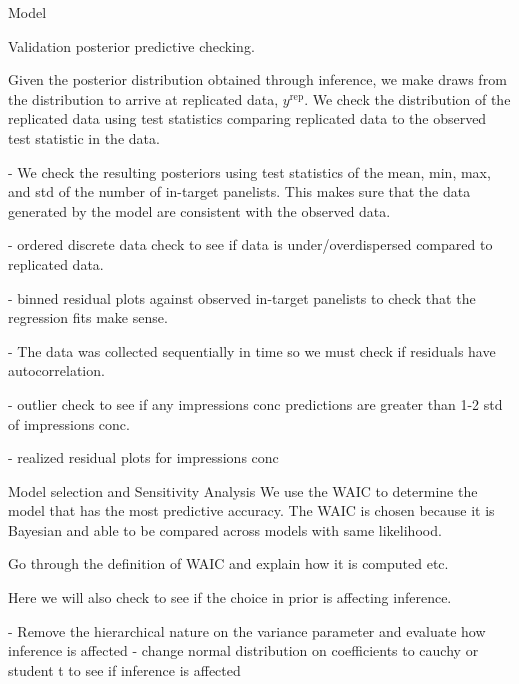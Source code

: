\begin{chapter}{Model}
\begin{section}{Validation}
  posterior predictive checking.

  Given the posterior distribution obtained through inference, we make draws
  from the distribution to arrive at replicated data, $y^{\text{rep}}$. We check
  the distribution of the replicated data using test statistics comparing replicated data to the observed
  test statistic in the data.

  - We check the resulting posteriors using test statistics
  of the mean, min, max, and std of the number of in-target panelists. This makes
  sure that the data generated by the model are consistent with the observed data.

  - ordered discrete data check to see if data is under/overdispersed compared to replicated data.

  - binned residual plots against observed in-target panelists to check that the
  regression fits make sense.

  - The data was collected sequentially in time so we must check if residuals
  have autocorrelation.

  - outlier check to see if any impressions conc predictions are greater than 1-2 std of impressions conc.

  - realized residual plots for impressions conc
\end{section}

\begin{section}{Model selection and Sensitivity Analysis}
  We use the WAIC to determine the model that has the most predictive accuracy.
  The WAIC is chosen because it is Bayesian and able to be compared across models
  with same likelihood.

  Go through the definition of WAIC and explain how it is computed etc.

  Here we will also check to see if the choice in prior is affecting inference.

  - Remove the hierarchical nature on the variance parameter and evaluate how inference is affected
  - change normal distribution on coefficients to cauchy or student t to see if inference is affected
\end{section}

\end{chapter}
